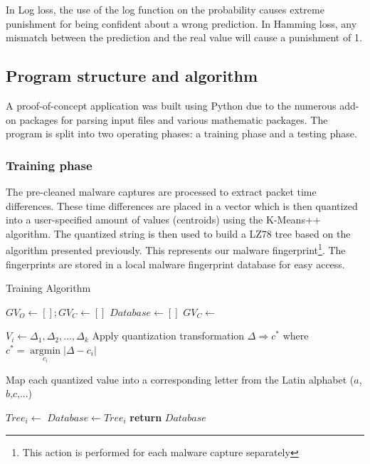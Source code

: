 \documentclass[9pt,journal,compsoc]{IEEEtran}
\makeatletter
\def\NoNumber#1{{\def\alglinenumber##1{}\State #1}\addtocounter{ALG@line}{-1}}
\makeatother
\begin{document}
In Log loss, the use of the log function on the probability causes extreme punishment for being confident about a wrong prediction.
In Hamming loss, any mismatch between the prediction and the real value will cause a punishment of 1.

\subsection{Program structure and algorithm}
A proof-of-concept application was built using Python due to the numerous add-on packages for parsing input files and various mathematic packages.
The program is split into two operating phases: a training phase and a testing phase.

\subsubsection{Training phase}\label{section:trainingp}
The pre-cleaned malware captures are processed to extract packet time differences.
These time differences are placed in a vector which is then quantized into a user-specified amount of values (centroids) using the K-Means++ algorithm. 
The quantized string is then used to build a LZ78 tree based on the algorithm presented previously. This represents our malware fingerprint\footnote{This action is performed for each malware capture separately}.
The fingerprints are stored in a local malware fingerprint database for easy access.
\begin{algorithm}
\caption{Training Algorithm}\label{alg:training}
\begin{algorithmic}[1]
\State ${GV}_O\gets[]; {GV}_C\gets[]$
\State ${Database}\gets[]$
   	\State {}
   \EndFor
   \State ${GV}_C\gets$

   	\State $V_i\gets\Delta_1,\Delta_2,...,\Delta_k$
   	\State Apply quantization transformation $
   	\Delta  \Rightarrow {c^*}$ 
   	\NoNumber{where ${c^*} = \mathop {\arg \min }\limits_{{c_i}} \left| {\Delta  - {c_i}} \right|$}
   	\State Map each quantized value  into a corresponding
   	\NoNumber{letter from the Latin alphabet ($a$,$b$,$c$,...)}
   	\State ${Tree}_i\gets$
    \State {}${Database}\gets{Tree}_i$ \label{alg:training:append_db}
   \EndFor
   \State \textbf{return} $Database$
\EndProcedure
\end{algorithmic}
\end{algorithm}
\end{document}
